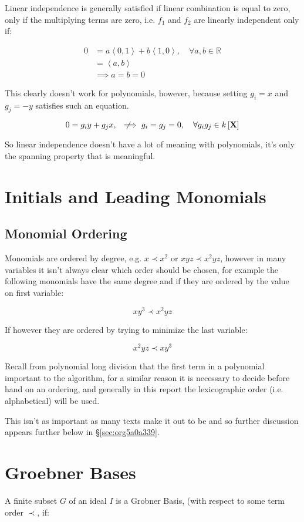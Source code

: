 \documentclass[a4paper,11pt,twoside]{article}
\begin{document}
Linear independence is generally satisfied if linear
combination is equal to zero, only if the multiplying terms are
zero, i.e. \(f_1\) and \(f_2\) are linearly independent only if:


$$\begin{aligned}
  0 & =a\left\langle 0,1\right\rangle +b\left\langle 1,0\right\rangle ,\quad\forall a,b\in\mathbb{R}\\
  & =\left\langle a,b\right\rangle \\
  & \implies a=b=0\end{aligned}$$    


This clearly doesn't work for polynomials, however, because setting \(g_{i}=x\) and
\(g_{j}=-y\) satisfies such an equation.

$$0=g_{i}y+g_{j}x,\quad\not\!\!\!\implies g_i=g_j=0, \quad \forall g_{i}g_{j}\in
    k\left[\mathbf{X}\right] $$


So linear independence doesn't have a lot of meaning with polynomials, 
it's only the spanning property that is meaningful.
\section{Initials and Leading Monomials}
\label{sec:orgec30a02}
\subsection{Monomial Ordering}
\label{sec:orga3337ef}
Monomials are ordered by degree, e.g. \(x \prec x^2\) or \(xyz
   \prec x^2yz\), however in many variables it isn't always clear
which order should be chosen, for example the following monomials
have the same degree and if they are ordered by the value on first variable:

\[
   xy^3 \prec x^2yz 
   \]

If however they are ordered by trying to minimize the last
variable:

\[
   x^2yz \prec xy^3
   \]

Recall from polynomial long division that the first term in a
polynomial important to the algorithm, for a similar reason it is
necessary to decide before hand on an ordering, and generally in
this report the lexicographic order (i.e. alphabetical) will be
used.

This isn't as important as many texts make it out to be and so
further discussion appears further below in \S \ref{sec:org5a0a339}.
\section{Groebner Bases}
\label{sec:orgd4f4ac5}
A finite subset \(G\) of an ideal \(I\) is a Grobner Basis, (with
respect to some term order \(\prec\), if: \cite{berndsturmfelsIntroductionGrobnerBases2017a,hibiGrobnerBasesStatistics2014}
\end{document}
